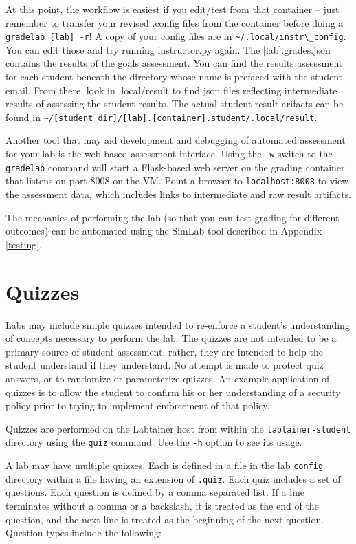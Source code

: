 \documentclass[12pt]{article}
\begin{document}
At this point, the workflow is easiest if you edit/test from that container --
just remember to transfer your revised .config files from the container before
doing a {\tt gradelab [lab] -r}!  A copy of your config files are in \verb!~/.local/instr\_config!.  You can edit
those and try running instructor.py again.  The [lab].grades.json contains the
results of the goals assessment.  You can find the results assessment for each 
student beneath the directory whose name is prefaced with the student email.  
From there, look in .local/result to find json files reflecting intermediate 
results of assessing the student results.  The actual student result arifacts
can be found in \verb!~/[student dir]/[lab].[container].student/.local/result!. 

Another tool that may aid development and debugging of automated assessment for your lab is the web-based assessment interface.
Using the {\tt -w} switch to the {\tt gradelab} command will start a Flask-based web server on the grading container that listens
on port 8008 on the VM.  Point a browser to {\tt localhost:8008} to view the assessment data, which includes links to intermediate and
raw result artifacts.

The mechanics of performing the lab (so that you can test grading for different outcomes)
can be automated using the SimLab tool described in Appendix \ref{testing}.

\section{Quizzes}
Labs may include simple quizzes intended to re-enforce a student's understanding of concepts
necessary to perform the lab.  The quizzes are not intended to be a primary source of
student assessment, rather, they are intended to help the student understand if they understand.
No attempt is made to protect quiz answers, or to randomize or parameterize quizzes.
An example application of quizzes is to allow the student to confirm his or her understanding
of a security policy prior to trying to implement enforcement of that policy.

Quizzes are performed on the Labtainer host from within the {\tt labtainer-student} directory
using the {\tt quiz} command.  Use the {\tt -h} option to see its usage.

A lab may have multiple quizzes.  Each is defined in a file in the lab {\tt config} directory
within a file having an extension of {\tt .quiz}.  Each quiz includes a set of
questions.  Each question is defined by a comma separated list.  If a line terminates 
without a comma or a backslash, it is treated as the end of the question, and the next line
is treated as the beginning of the next question.
Question types include the following:
\end{document}
